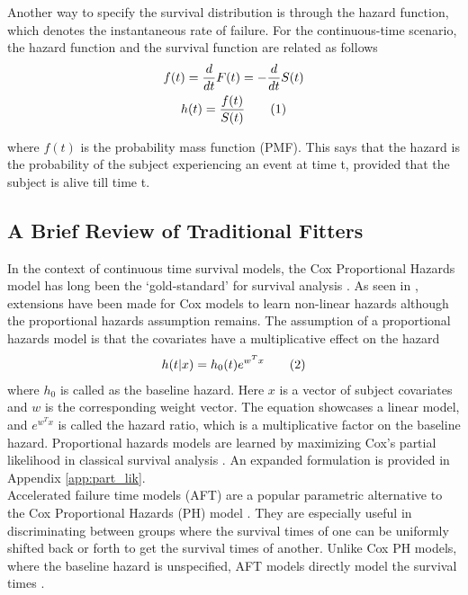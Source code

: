 \documentclass[%
 twocolumn,
 reprint,
 amsmath,amssymb,
 aps,nofootinbib
]{revtex4-2}
\newcommand\numberthis{\addtocounter{equation}{1}\tag{\theequation}} %
\begin{document}
Another way to specify the survival distribution is through the hazard function, which denotes the instantaneous rate of failure. For the continuous-time scenario, the hazard function and the survival function are related as follows 
\begin{gather*}
f(t) = \frac{d}{dt}F(t) = -\frac{d}{dt}S(t)\\
h(t) = \frac{f(t)}{S(t)} \numberthis \label{eq:haz_pmf_surv}
\end{gather*}

where $f(t)$ is the probability mass function (PMF). This says that the hazard is the probability of the subject experiencing an event at time t, provided that the subject is alive till time t. \\

\subsection{\label{trad_fits}A Brief Review of Traditional Fitters}
In the context of continuous time survival models, the Cox Proportional Hazards model has long been the `gold-standard' for survival analysis \cite{cph}. As seen in \cite{deepsurv}, extensions have been made for Cox models to learn non-linear hazards although the proportional hazards assumption remains. The assumption of a proportional hazards model is that the covariates have a multiplicative effect on the hazard
\begin{gather*}
h(t|x) = h_0(t)e^{w^Tx} \numberthis  \label{eq:prop_haz}
\end{gather*}
where $h_0$ is called as the baseline hazard. Here $x$ is a vector of subject covariates and $w$ is the corresponding weight vector. The equation showcases a linear model, and $e^{w^Tx}$ is called the hazard ratio, which is a multiplicative factor on the baseline hazard. Proportional hazards models are learned by maximizing Cox’s partial likelihood in classical survival analysis \cite{raykar_cindex}. An expanded formulation is provided in Appendix \ref{app:part_lik}.\\

Accelerated failure time models (AFT) are a popular parametric alternative to the Cox Proportional Hazards (PH) model \cite{aft}. They are especially useful in discriminating between groups where the survival times of one can be uniformly shifted back or forth to get the survival times of another. Unlike Cox PH models, where the baseline hazard is unspecified, AFT models directly model the survival times \cite{aft_2009}.\\
\end{document}
